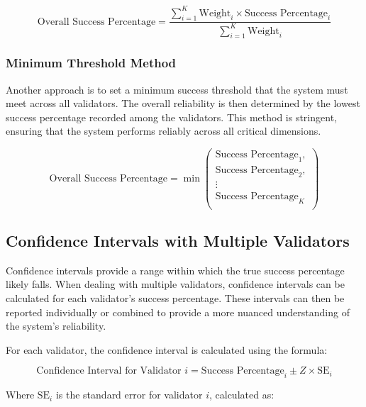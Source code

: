 \documentclass{article}
\begin{document}
\begin{equation*}
\text{Overall Success Percentage} = \frac{\sum_{i=1}^{K} \text{Weight}_i \times \text{Success Percentage}_i}{\sum_{i=1}^{K} \text{Weight}_i}
\end{equation*}

\subsubsection{Minimum Threshold Method}

Another approach is to set a minimum success threshold that the system must meet across all validators. The overall reliability is then determined by the lowest success percentage recorded among the validators. This method is stringent, ensuring that the system performs reliably across all critical dimensions.

\begin{equation*}
\text{Overall Success Percentage} = \min \left( \begin{array}{c}
\text{Success Percentage}_1, \\
\text{Success Percentage}_2, \\
\vdots \\
\text{Success Percentage}_K \\
\end{array} \right)
\end{equation*}


\subsection{Confidence Intervals with Multiple Validators}

Confidence intervals provide a range within which the true success percentage likely falls. When dealing with multiple validators, confidence intervals can be calculated for each validator’s success percentage. These intervals can then be reported individually or combined to provide a more nuanced understanding of the system’s reliability.

For each validator, the confidence interval is calculated using the formula:

\begin{equation*}
\text{Confidence Interval for Validator } i = \text{Success Percentage}_i \pm Z \times \text{SE}_i
\end{equation*}

Where \( \text{SE}_i \) is the standard error for validator \( i \), calculated as:
\end{document}
